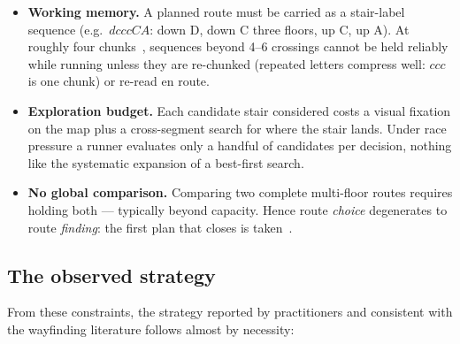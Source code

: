 \documentclass[11pt,a4paper,twocolumn]{article}
\begin{document}
\begin{itemize}
    \item \textbf{Working memory.} A planned route must be carried as a
          stair-label sequence (e.g.\ $dcccCA$: down D, down C three floors,
          up C, up A). At roughly four chunks~\cite{cowan2001}, sequences
          beyond 4--6 crossings cannot be held reliably while running unless
          they are re-chunked (repeated letters compress well: $ccc$ is one
          chunk) or re-read en route.
    \item \textbf{Exploration budget.} Each candidate stair considered costs
          a visual fixation on the map plus a cross-segment search for where
          the stair lands. Under race pressure a runner evaluates only a
          handful of candidates per decision, nothing like the systematic
          expansion of a best-first search.
    \item \textbf{No global comparison.} Comparing two complete multi-floor
          routes requires holding both --- typically beyond capacity. Hence
          route \emph{choice} degenerates to route \emph{finding}: the first
          plan that closes is taken~\cite{simon1956}.
\end{itemize}

\subsection{The observed strategy}
\label{sec:observed-strategy}

From these constraints, the strategy reported by practitioners and consistent
with the wayfinding literature follows almost by necessity:
\end{document}
